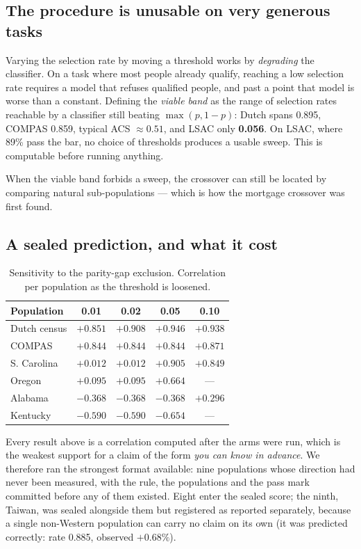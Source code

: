 \documentclass[9pt,conference]{IEEEtran}
\begin{document}
\subsection{The procedure is unusable on very generous tasks}

Varying the selection rate by moving a threshold works by \emph{degrading} the classifier. On a
task where most people already qualify, reaching a low selection rate requires a model that
refuses qualified people, and past a point that model is worse than a constant. Defining the
\emph{viable band} as the range of selection rates reachable by a classifier still beating
$\max(p, 1-p)$: Dutch spans 0.895, COMPAS 0.859, typical ACS $\approx 0.51$, and LSAC only
\textbf{0.056}. On LSAC, where 89\% pass the bar, no choice of thresholds produces a usable
sweep. This is computable before running anything.

When the viable band forbids a sweep, the crossover can still be located by comparing natural
sub-populations --- which is how the mortgage crossover was first found.

\subsection{A sealed prediction, and what it cost}
\label{sec:sealed}

\begin{table}[t]
\caption{Sensitivity to the parity-gap exclusion. Correlation per population as the
threshold is loosened.}
\label{tab:sensitivity}
\centering
\footnotesize
\setlength{\tabcolsep}{5pt}
\begin{tabular}{@{}lcccc@{}}
\toprule
\textbf{Population} & \textbf{0.01} & \textbf{0.02} & \textbf{0.05} & \textbf{0.10} \\
\midrule
Dutch census & $+0.851$ & $+0.908$ & $+0.946$ & $+0.938$ \\
COMPAS & $+0.844$ & $+0.844$ & $+0.844$ & $+0.871$ \\
S. Carolina & $+0.012$ & $+0.012$ & $+0.905$ & $+0.849$ \\
Oregon & $+0.095$ & $+0.095$ & $+0.664$ & --- \\
Alabama & $-0.368$ & $-0.368$ & $-0.368$ & $+0.296$ \\
Kentucky & $-0.590$ & $-0.590$ & $-0.654$ & --- \\
\bottomrule
\end{tabular}
\end{table}

Every result above is a correlation computed after the arms were run, which is the weakest
support for a claim of the form \emph{you can know in advance}. We therefore ran the strongest
format available: nine populations whose direction had never been measured, with the rule, the
populations and the pass mark committed before any of them existed. Eight enter the sealed
score; the ninth, Taiwan, was sealed alongside them but registered as reported separately,
because a single non-Western population can carry no claim on its own (it was predicted
correctly: rate 0.885, observed $+0.68\%$).
\end{document}
